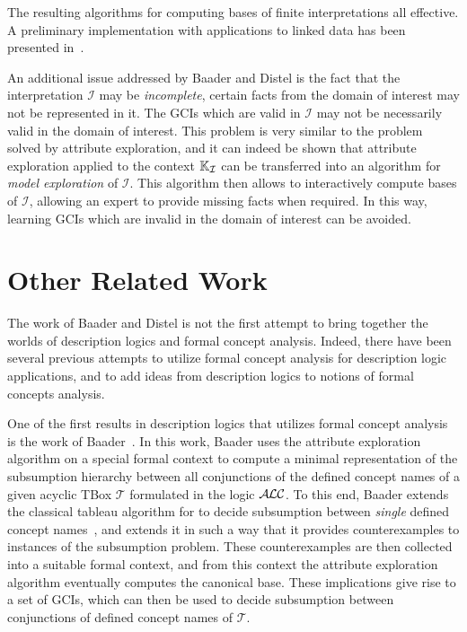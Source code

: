 The resulting algorithms for computing bases of finite interpretations all effective.  A
preliminary implementation with applications to linked data has been presented
in~\cite{DBLP:conf/icdm/BorchmannD11}.

An additional issue addressed by Baader and Distel is the fact that the interpretation
$\mathcal{I}$ may be \emph{incomplete}, \ie certain facts from the domain of interest may
not be represented in it.  The GCIs which are valid in $\mathcal{I}$ may not be
necessarily valid in the domain of interest.  This problem is very similar to the problem
solved by attribute exploration, and it can indeed be shown that attribute exploration
applied to the context ${\mathbb{K}}_{\mathcal{I}}$ can be transferred into an algorithm for
\emph{model exploration} of $\mathcal{I}$.  This algorithm then allows to interactively
compute bases of $\mathcal{I}$, allowing an expert to provide missing facts when required.
In this way, learning GCIs which are invalid in the domain of interest can be avoided.

\section{Other Related Work}
\label{sec:related-work}

The work of Baader and Distel is not the first attempt to bring together the worlds of
description logics and formal concept analysis.  Indeed, there have been several previous
attempts to utilize formal concept analysis for description logic applications, and to add
ideas from description logics to notions of formal concepts analysis.

One of the first results in description logics that utilizes formal concept analysis is
the work of Baader~\cite{Baader-KRUSE-95}.  In this work, Baader uses the attribute
exploration algorithm on a special formal context to compute a minimal representation of
the subsumption hierarchy between all conjunctions of the defined concept names of a given
acyclic TBox $\mathcal{T}$ formulated in the logic $\mathcal{A}\kern-0.05em\mathcal{L}\mathcal{C}$.  To this end, Baader extends
the classical tableau algorithm for \ALC to decide subsumption between \emph{single}
defined concept names~\cite{journals/ai/Schmidt-SchaussS91}, and extends it in such a way
that it provides counterexamples to instances of the subsumption problem.  These
counterexamples are then collected into a suitable formal context, and from this context
the attribute exploration algorithm eventually computes the canonical base.  These
implications give rise to a set of GCIs, which can then be used to decide subsumption
between conjunctions of defined concept names of $\mathcal{T}$.

